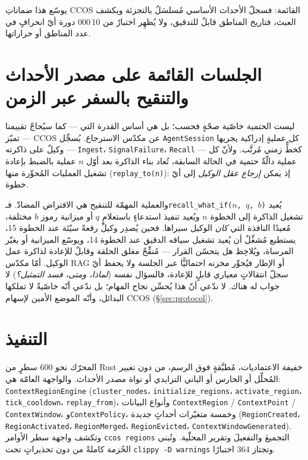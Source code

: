 \documentclass[11pt]{article}
\newcommand{\code}[1]{\textenglish{\texttt{#1}}}
\begin{document}
يوسّع هذا ضماناتِ CCOS القائمة: فسجلّ الأحداث الأساسي مُسلسَلٌ بالتجزئة ويكشف العبث، فتاريخ
المناطق قابلٌ للتدقيق، ولا يُظهِر اختبارٌ من 10\,000 دورة أيّ انحرافٍ في عدد المناطق أو
حراراتها.

\section{الجلسات القائمة على مصدر الأحداث والتنقيح بالسفر عبر الزمن}\label{sec:timetravel}

ليست الحتمية خاصّية صحّةٍ فحسب؛ بل هي أساس القدرة التي --- كما سيُحاجّ تقييمنا --- تميّز CCOS
عن مكدّس الاسترجاع. يُسجِّل \code{AgentSession} كل عمليةٍ إدراكية يجريها وكيلٌ على ذاكرته ---
\code{Ingest}، \code{SignalFailure}، \code{Recall} --- كخطٍّ زمني مُرتَّب. ولأنّ كل عملية
دالّةٌ حتمية في الحالة السابقة، تُعاد بناء الذاكرة بعد أوّل $n$ عملية بالضبط بإعادة تشغيل
العمليات المُحوِّرة منها (\code{replay\_to(n)}): إذ يمكن \emph{إرجاع عقل الوكيل} إلى أيّ
خطوة.

والعملية المهمّة للتنقيح هي الافتراض المضادّ. فـ\code{recall\_what\_if($n$, $q$, $b$)}
يُعيد تشغيل الذاكرة إلى الخطوة $n$ ويُعيد تنفيذ استدعاءٍ باستعلامٍ $q$ أو ميزانية رموز $b$
مختلفة، مُعيدًا النافذة التي \emph{كان} الوكيل سيراها. فحين يُصدِر وكيلٌ رقعةً سيّئة عند
الخطوة 15، يستطيع مُشغِّلٌ أن يُعيد تشغيل سياقه الدقيق عند الخطوة 14، ويوسّع الميزانية أو
يغيّر المرساة، ويُلاحِظ هل يتحسّن القرار --- مُنقِّحٌ مغلق الحلقة وقابلٌ للإعادة لذاكرة عمل
الوكيل. أمّا مكدّس RAG أو الإطار فيُحوِّر مخزنه احتماليًّا عبر الجلسة ولا يحفظ أيّ سجلّ
انتقالاتٍ معياري قابلٍ للإعادة، فالسؤال نفسه (\emph{لماذا، ومتى، فسد التمثيل؟}) لا جواب له
هناك. لا ندّعي أنّ هذا يُحسِّن نجاح المهام؛ بل ندّعي أنّه خاصّيةٌ لا تملكها البدائل، وأنّه
الموضع الأمين لإسهام CCOS (\S\ref{sec:protocol}).

\section{التنفيذ}\label{sec:impl}

المحرّك نحو $600$ سطرٍ من Rust خفيفة الاعتماديات، مُطبَّقةٍ فوق الرسم، من دون تغيير المُحلِّل
أو الحارس أو الباني التزايدي أو نواة مصدر الأحداث. والواجهة العامّة هي:
\code{ContextRegionEngine} (\code{cluster\_nodes}، \code{initialize\_regions}،
\code{activate\_region}، \code{tick\_cooldown}، \code{replay\_from})، وأنواع البيانات
\code{ContextRegion} / \code{ContextPoint} / \code{ContextWindow}، و\code{ContextPolicy}،
وخمسة متغيّرات أحداثٍ جديدة (\code{RegionCreated}، \code{RegionActivated}،
\code{RegionMerged}، \code{RegionEvicted}، \code{ContextWindowGenerated}). وتكشف واجهة
سطر الأوامر \code{ccos regions} التجميعَ والتفعيلَ وتقرير المحلّية. وتُبنى الحُزمة كاملةً من
دون تحذيراتٍ تحت \code{clippy -D warnings} وتجتاز 364 اختبارًا.
\end{document}
